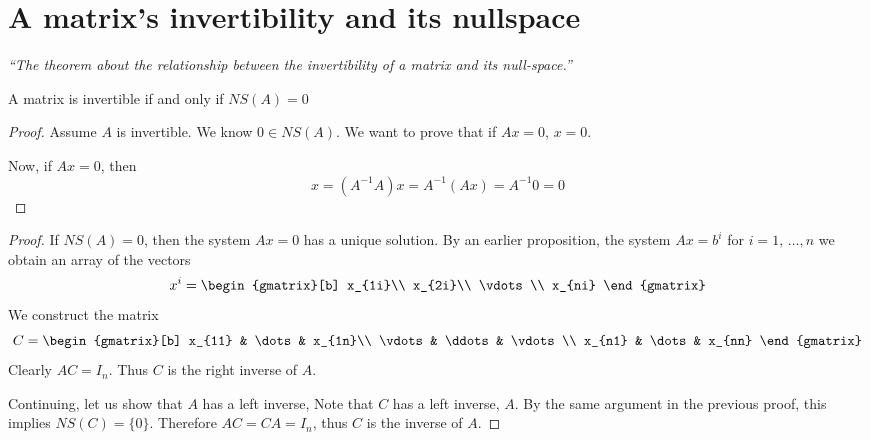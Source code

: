 \documentclass[12pt]{report}
\begin{document}
    \section{A matrix's invertibility and its nullspace} 
    \textit{``The theorem about the relationship between the invertibility of a matrix and its null-space.''} \vspace{3mm}
    \begin{theorem}
        A matrix is invertible if and only if \(NS(A) = 0\)
    \end{theorem}
    \begin{proof}
        Assume \(A\) is invertible. We know \(0 \in NS(A)\). We want to prove that if \(Ax = 0\), \(x=0\). 
        
        Now, if \(Ax = 0\), then
        \[x = (A^{-1}A)x = A^{-1}(Ax) = A^{-1} 0 = 0\]
    \end{proof}
    \begin{proof}
        If \(NS(A) = 0\), then the system \(Ax = 0\) has a unique solution. By an earlier proposition, the system \(Ax = b^i\) for \(i=1, \, \dots, n\) we obtain an array of the vectors
        \[x^i = \begin{gmatrix}[b]
            x_{1i}\\
            x_{2i}\\
            \vdots\\
            x_{ni}
        \end{gmatrix}\]
        We construct the matrix
        \[C = \begin{gmatrix}[b]
            x_{11} & \dots & x_{1n}\\
            \vdots & \ddots & \vdots\\
            x_{n1} & \dots & x_{nn}
        \end{gmatrix}\]
        Clearly \(AC = I_n\). Thus \(C\) is the right inverse of \(A\).

        Continuing, let us show that \(A\) has a left inverse, Note that \(C\) has a left inverse, \(A\). By the same argument in the previous proof, this implies \(NS(C) = \{0\}\). Therefore \(AC = CA = I_n\), thus \(C\) is the inverse of \(A\).
    \end{proof} \newpage
\end{document}
